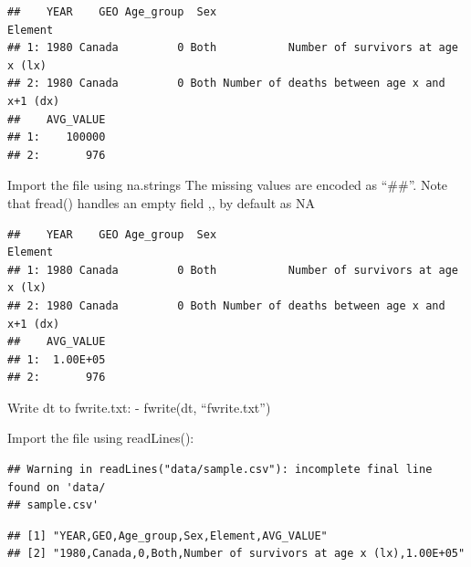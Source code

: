 \documentclass[]{book}
\newenvironment{Shaded}{\begin{snugshade}}{\end{snugshade}}
\newcommand{\DataTypeTok}[1]{\textcolor[rgb]{0.13,0.29,0.53}{#1}}
\newcommand{\DecValTok}[1]{\textcolor[rgb]{0.00,0.00,0.81}{#1}}
\newcommand{\KeywordTok}[1]{\textcolor[rgb]{0.13,0.29,0.53}{\textbf{#1}}}
\newcommand{\NormalTok}[1]{#1}
\newcommand{\OperatorTok}[1]{\textcolor[rgb]{0.81,0.36,0.00}{\textbf{#1}}}
\newcommand{\StringTok}[1]{\textcolor[rgb]{0.31,0.60,0.02}{#1}}
\begin{document}
\begin{verbatim}
##    YEAR    GEO Age_group  Sex                                     Element
## 1: 1980 Canada         0 Both           Number of survivors at age x (lx)
## 2: 1980 Canada         0 Both Number of deaths between age x and x+1 (dx)
##    AVG_VALUE
## 1:    100000
## 2:       976
\end{verbatim}

Import the file using na.strings
The missing values are encoded as ``\#\#''. Note that fread() handles an empty field ,, by default as NA

\begin{Shaded}
\end{Shaded}

\begin{verbatim}
##    YEAR    GEO Age_group  Sex                                     Element
## 1: 1980 Canada         0 Both           Number of survivors at age x (lx)
## 2: 1980 Canada         0 Both Number of deaths between age x and x+1 (dx)
##    AVG_VALUE
## 1:  1.00E+05
## 2:       976
\end{verbatim}

Write dt to fwrite.txt:
- fwrite(dt, ``fwrite.txt'')

Import the file using readLines():

\begin{Shaded}
\end{Shaded}

\begin{verbatim}
## Warning in readLines("data/sample.csv"): incomplete final line found on 'data/
## sample.csv'
\end{verbatim}

\begin{verbatim}
## [1] "YEAR,GEO,Age_group,Sex,Element,AVG_VALUE"                     
## [2] "1980,Canada,0,Both,Number of survivors at age x (lx),1.00E+05"
\end{verbatim}
\end{document}
